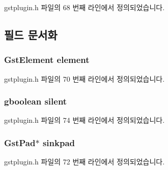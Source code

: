 gstplugin.\+h 파일의 68 번째 라인에서 정의되었습니다.



\subsection{필드 문서화}
\subsubsection[{\texorpdfstring{element}{element}}]{\setlength{\rightskip}{0pt plus 5cm}Gst\+Element element}\hypertarget{struct___gst_plugin_template_aa44175fd50974e0b9b5a86e52a735c5c}{}\label{struct___gst_plugin_template_aa44175fd50974e0b9b5a86e52a735c5c}


gstplugin.\+h 파일의 70 번째 라인에서 정의되었습니다.

\subsubsection[{\texorpdfstring{silent}{silent}}]{\setlength{\rightskip}{0pt plus 5cm}gboolean silent}\hypertarget{struct___gst_plugin_template_a0003b52c71453f2f020b1df5e8c40723}{}\label{struct___gst_plugin_template_a0003b52c71453f2f020b1df5e8c40723}


gstplugin.\+h 파일의 74 번째 라인에서 정의되었습니다.

\subsubsection[{\texorpdfstring{sinkpad}{sinkpad}}]{\setlength{\rightskip}{0pt plus 5cm}Gst\+Pad$\ast$ sinkpad}\hypertarget{struct___gst_plugin_template_a0cd494edebad1c57835d375e95523c15}{}\label{struct___gst_plugin_template_a0cd494edebad1c57835d375e95523c15}


gstplugin.\+h 파일의 72 번째 라인에서 정의되었습니다.

